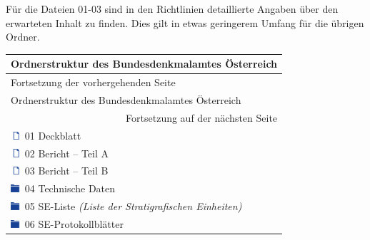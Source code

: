 Für die Dateien 01-03 sind in den Richtlinien detaillierte Angaben über den erwarteten Inhalt zu finden. Dies gilt in etwas geringerem Umfang für die übrigen Ordner.  
\begin{center}
	\begin{longtable}{l}
		\toprule
		Ordnerstruktur des Bundesdenkmalamtes Österreich \\ \midrule \endfirsthead
		\footnotesize Fortsetzung der vorhergehenden Seite\\
		\toprule
		Ordnerstruktur des Bundesdenkmalamtes Österreich \\ \midrule \endhead
		\bottomrule \multicolumn{1}{r}{{\footnotesize Fortsetzung auf der nächsten Seite}} \\
		\endfoot
		\bottomrule 
		\endlastfoot
		
		\includegraphics[width=0.4cm]{bilder/DateiIcon.png} \hspace*{0.04cm} 01 Deckblatt\\
		\includegraphics[width=0.4cm]{bilder/DateiIcon.png} \hspace*{0.04cm} 02 Bericht -- Teil A\\
		\includegraphics[width=0.4cm]{bilder/DateiIcon.png} \hspace*{0.04cm} 03 Bericht -- Teil B\\
		\includegraphics[width=0.4cm]{bilder/OrdnerIconZu.png} \hspace*{0.04cm} 04 Technische Daten\\
		\includegraphics[width=0.4cm]{bilder/OrdnerIconZu.png} \hspace*{0.04cm} 05 SE-Liste \textit{(Liste der Stratigrafischen Einheiten)}\\
		\includegraphics[width=0.4cm]{bilder/OrdnerIconZu.png} \hspace*{0.04cm} 06 SE-Protokollblätter\\

\end{longtable}
\end{center}
